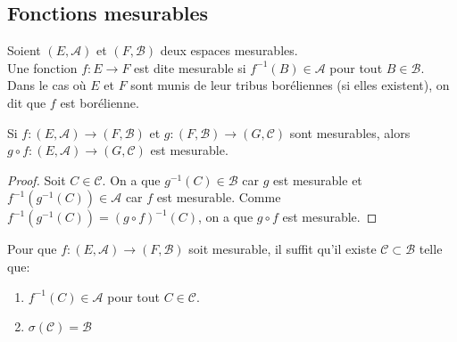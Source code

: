 \subsection{Fonctions mesurables}

\begin{definition}
	Soient $(E, \mathscr{A})$ et $(F, \mathscr{B})$ deux espaces mesurables.\\
	Une fonction $f: E \to F$ est dite mesurable si $f^{-1}(B) \in \mathscr{A}$ pour tout $B \in \mathscr{B}$.\\
	Dans le cas où $E$ et $F$ sont munis de leur tribus boréliennes (si elles existent), on dit que $f$ est borélienne.
\end{definition}


\begin{prop}
	Si $f: (E, \mathscr{A}) \to (F, \mathscr{B})$ et $g: (F, \mathscr{B}) \to (G, \mathscr{C})$
	sont mesurables, alors $g \circ f : (E, \mathscr{A}) \to (G, \mathscr{C})$ est mesurable.
\end{prop}

\begin{proof}
	Soit $C \in \mathscr{C}$. On a que $g^{-1}(C) \in \mathscr{B}$ car $g$ est mesurable et
	$f^{-1}(g^{-1}(C)) \in \mathscr{A}$ car $f$ est mesurable.
	Comme $f^{-1}(g^{-1}(C)) = (g \circ f)^{-1}(C)$, on a que $g \circ f$ est mesurable.
\end{proof}


\begin{prop}
	Pour que $f : (E, \mathscr{A}) \to (F, \mathscr{B})$ soit mesurable, il suffit qu'il existe $\mathscr{C} \subset \mathscr{B}$ telle que:
	\begin{enumerate}
		\item $f^{-1}(C) \in \mathscr{A}$ pour tout $C \in \mathscr{C}$.
		\item $\sigma(\mathscr{C}) = \mathscr{B}$
	\end{enumerate}
\end{prop}

